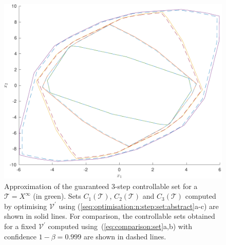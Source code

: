 \documentclass{ifacconf}
\providecommand{\V}{\mathcal V}
\providecommand{\T}{\mathcal T}
\begin{document}
\begin{figure}[ht]
\includegraphics[width=.99\linewidth]{NStepSetOptimised.pdf}
\caption{Approximation of the guaranteed 3-step controllable set for a $\T=X^\infty$ (in \textcolor[rgb]{0.4667,0.6745,0.1882}{green}). Sets $C_1(\T)$, $C_2(\T)$ and $C_3(\T)$ computed by optimising $\V^\prime$ using  (\ref{seq:optimisation:n:step:set:abstract}a-c) are shown in solid lines. For comparison, the controllable sets obtained for a fixed $\V^\prime$ computed using~(\ref{eq:comparison:set}a,b) with 
confidence $1-\beta= 0.999$ are shown in dashed lines.}
\label{fig:n:step:controllable:set}
\vspace{4mm}\end{figure}
\end{document}
